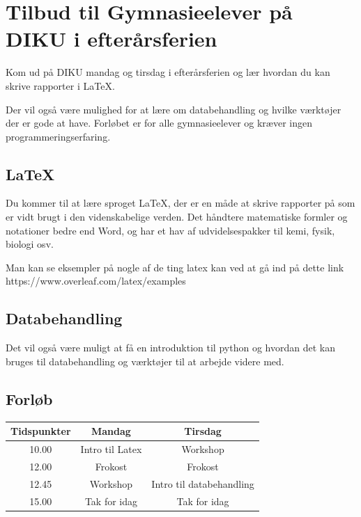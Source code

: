 \documentclass[14pt]{article}
\begin{document}
    \newpage                %
    \setcounter{page}{1}    %
\section*{Tilbud til Gymnasieelever på DIKU i efterårsferien}
Kom ud på DIKU mandag og tirsdag i efterårsferien og lær hvordan du kan skrive
rapporter i LaTeX.

Der vil også være mulighed for at lære om databehandling og hvilke værktøjer der
er gode at have. Forløbet er for alle gymnasieelever og kræver ingen
programmeringserfaring.
\subsection*{LaTeX}
    Du kommer til at lære sproget LaTeX, der er en måde at skrive rapporter på
    som er vidt brugt i den videnskabelige verden. Det håndtere matematiske
    formler og notationer bedre end Word, og har et hav af udvidelsespakker til
    kemi, fysik, biologi osv.

    Man kan se eksempler på nogle af de ting latex kan ved at gå ind på dette
    link https://www.overleaf.com/latex/examples

\subsection*{Databehandling}
Det vil også være muligt at få en introduktion til python og hvordan det kan
bruges til databehandling og værktøjer til at arbejde videre med.

\subsection*{Forløb}

\Large{
\begin{center}
\begin{tabular}{ c || c | c }
    Tidspunkter &  Mandag & Tirsdag \\
    \hline
    10.00 & Intro til Latex & Workshop \\
    12.00 & Frokost         & Frokost \\
    12.45 & Workshop        & Intro til databehandling \\
    15.00 & Tak for idag    & Tak for idag \\
\end{tabular}
\end{center}
}
\end{document}
